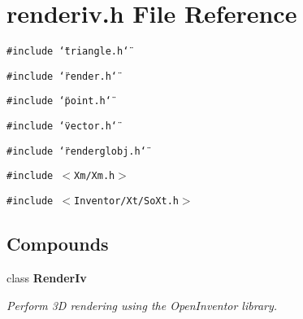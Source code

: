 \section{renderiv.h File Reference}
\label{renderiv_8h}
{\tt \#include \char`\"{}triangle.h\char`\"{}}\par
{\tt \#include \char`\"{}render.h\char`\"{}}\par
{\tt \#include \char`\"{}point.h\char`\"{}}\par
{\tt \#include \char`\"{}vector.h\char`\"{}}\par
{\tt \#include \char`\"{}renderglobj.h\char`\"{}}\par
{\tt \#include $<$Xm/Xm.h$>$}\par
{\tt \#include $<$Inventor/Xt/So\-Xt.h$>$}\par
\subsection*{Compounds}
\begin{CompactItemize}
\item 
class {\bf Render\-Iv}
\begin{CompactList}\small\item\em Perform 3D rendering using the Open\-Inventor library.\item\end{CompactList}\end{CompactItemize}
